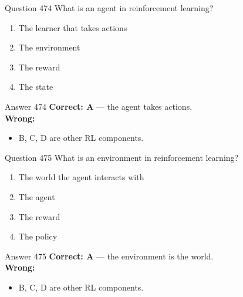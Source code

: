 \documentclass[aspectratio=169,11pt]{beamer}
\begin{document}
	\begin{frame}{Question 474}
		What is an agent in reinforcement learning?
		\begin{enumerate}[label=\Alph*.]
			\item The learner that takes actions
			\item The environment
			\item The reward
			\item The state
		\end{enumerate}
	\end{frame}
	\begin{frame}{Answer 474}
		\textbf{Correct: A} --- the agent takes actions.\\
		\vspace{0.5em}
		\textbf{Wrong:}
		\begin{itemize}
			\item B, C, D are other RL components.
		\end{itemize}
	\end{frame}
	
	\begin{frame}{Question 475}
		What is an environment in reinforcement learning?
		\begin{enumerate}[label=\Alph*.]
			\item The world the agent interacts with
			\item The agent
			\item The reward
			\item The policy
		\end{enumerate}
	\end{frame}
	\begin{frame}{Answer 475}
		\textbf{Correct: A} --- the environment is the world.\\
		\vspace{0.5em}
		\textbf{Wrong:}
		\begin{itemize}
			\item B, C, D are other RL components.
		\end{itemize}
	\end{frame}
	
\end{document}
